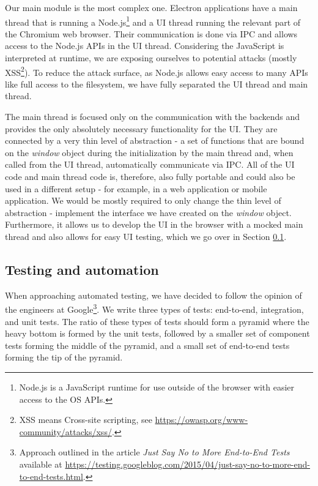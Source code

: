 \documentclass[thesismargins, english, thesislinespacing, onelinechapterstyle, upjsfrontpage]{rnthesis}
\begin{document}
Our main module is the most complex one.
Electron applications have a main thread that is running a Node.js\footnote{Node.js is a JavaScript runtime for use outside of the browser with easier access to the OS APIs.} and a UI thread running the relevant part of the Chromium web browser.
Their communication is done via IPC and allows access to the Node.js APIs in the UI thread.
Considering the JavaScript is interpreted at runtime, we are exposing ourselves to potential attacks (mostly XSS\footnote{XSS means Cross-site scripting, see \url{https://owasp.org/www-community/attacks/xss/}.}).
To reduce the attack surface, as Node.js allows easy access to many APIs like full access to the filesystem, we have fully separated the UI thread and main thread.

The main thread is focused only on the communication with the backends and provides the only absolutely necessary functionality for the UI.
They are connected by a very thin level of abstraction - a set of functions that are bound on the \textit{window} object during the initialization by the main thread and, when called from the UI thread, automatically communicate via IPC.
All of the UI code and main thread code is, therefore, also fully portable and could also be used in a different setup - for example, in a web application or mobile application.
We would be mostly required to only change the thin level of abstraction - implement the interface we have created on the \textit{window} object.
Furthermore, it allows us to develop the UI in the browser with a mocked main thread and also allows for easy UI testing, which we go over in Section \ref{testing}.

\subsection{Testing and automation} \label{testing}

When approaching automated testing, we have decided to follow the opinion of the engineers at Google\footnote{Approach outlined in the article \textit{Just Say No to More End-to-End Tests} available at \url{https://testing.googleblog.com/2015/04/just-say-no-to-more-end-to-end-tests.html}.}.
We write three types of tests: end-to-end, integration, and unit tests.
The ratio of these types of tests should form a pyramid where the heavy bottom is formed by the unit tests, followed by a smaller set of component tests forming the middle of the pyramid, and a small set of end-to-end tests forming the tip of the pyramid.
\end{document}
